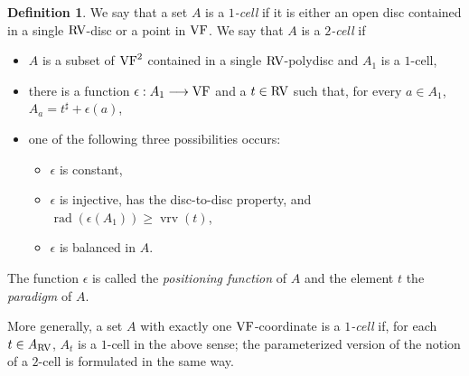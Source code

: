\documentclass[12pt]{amsart}
\newcommand{\memph}[1]{{\color{magenta}\emph{#1}}}
\theoremstyle{plain}
\theoremstyle{definition}
\newtheorem{defn}[thm]{Definition}
\theoremstyle{remark}
\numberwithin{equation}{section}
\theoremstyle{plain}
\newcommand{\VF}{\textup{VF}}
\newcommand{\RV}{\textup{RV}}
\newcommand{\0}{\emptyset}
\newcommand{\fun}{\longrightarrow}
\DeclareMathOperator{\rad}{rad}
\DeclareMathOperator{\vrv}{vrv}
\begin{document}
\begin{defn}\label{def:units}
We say that a set $A$ is a \memph{$1$-cell} if it is either an open disc contained in a single $\RV$-disc or a point in $\VF$. We say
that $A$ is a \memph{$2$-cell} if
\begin{itemize}
 \item $A$ is a subset of $\VF^2$ contained in a single $\RV$-polydisc and $A_1$ is a $1$-cell,
 \item there is a function $\epsilon : A_1  \fun \VF$ and a $t \in \RV$ such that, for every $a \in A_1$, $A_a = t^\sharp + \epsilon(a)$,
 \item one of the following three possibilities occurs:
  \begin{itemize}
   \item $\epsilon$ is constant,
   \item $\epsilon$ is injective, has the disc-to-disc property, and $\rad(\epsilon(A_1)) \geq \vrv(t)$,
   \item $\epsilon$ is balanced in $A$.
  \end{itemize}
\end{itemize}
The function $\epsilon$ is called the \memph{positioning function} of $A$ and the element $t$ the \memph{paradigm} of $A$.

More generally, a set $A$ with exactly one $\VF$-coordinate is a \memph{$1$-cell} if, for each $t \in A_{\RV}$, $A_t$ is a $1$-cell in the above sense; the parameterized version of the notion of a $2$-cell is formulated in the same way.
\end{defn}
\end{document}
